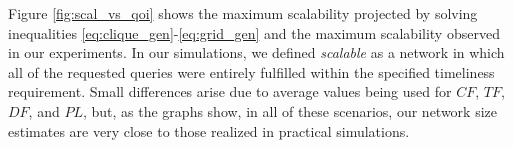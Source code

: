 Figure \ref{fig:scal_vs_qoi} shows the maximum scalability projected by solving inequalities \ref{eq:clique_gen}-\ref{eq:grid_gen} and the maximum scalability observed in our experiments.  In our simulations, we defined \emph{scalable} as a network in which all of the requested queries were entirely fulfilled within the specified timeliness requirement.  Small differences arise due to average values being used for $CF$, $TF$, $DF$, and $PL$, but, as the graphs show, in all of these scenarios, our network size estimates are very close to those realized in practical simulations.



%










